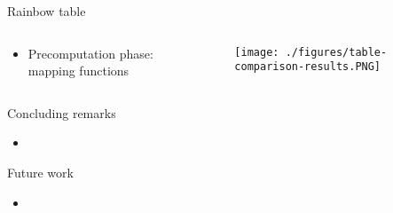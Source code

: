 \documentclass{beamer}
\begin{document}
\begin{frame}{Rainbow table}
\begin{columns}
\begin{column}{4cm}
\footnotesize{
\begin{itemize}
	\item Precomputation phase: mapping functions  \end{itemize}}
\end{column}
\begin{column}{6.5cm}
	\begin{figure}[htp]
	\centering
	\texttt{[image: ./figures/table-comparison-results.PNG]}
	\end{figure}
\end{column}
\end{columns}

\end{frame}

\begin{frame}{Concluding remarks}
\footnotesize{
\begin{itemize}
	\item 
\end{itemize}
}\end{frame}

\begin{frame}{Future work}
\footnotesize{
\begin{itemize}
	\item 
\end{itemize}
}\end{frame}

\begin{frame}
\begin{center}
\end{center}
\end{frame}
\end{document}
